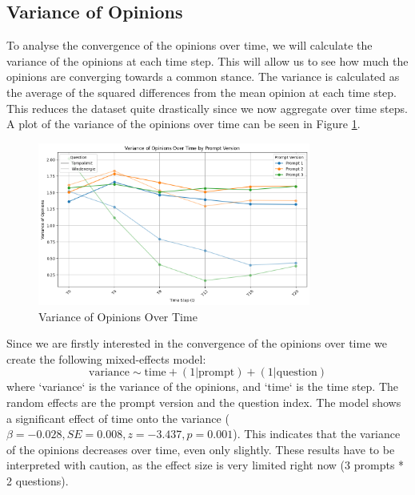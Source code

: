 \documentclass[12pt]{article}
\begin{document}
\subsection{Variance of Opinions}
To analyse the convergence of the opinions over time, we will calculate the variance of the opinions at each time step. This will allow us to see how much the opinions are converging towards a common stance. The variance is calculated as the average of the squared differences from the mean opinion at each time step. This reduces the dataset quite drastically since we now aggregate over time steps. A plot of the variance of the opinions over time can be seen in Figure \ref{fig:variance_of_opinions}. 


\begin{figure}[h]
\centering
\includegraphics[width=0.8\textwidth]{img/variance_of_opinions.png}
\caption{Variance of Opinions Over Time}
\label{fig:variance_of_opinions}
\end{figure}

Since we are firstly interested in the convergence of the opinions over time we create the following mixed-effects model:
\begin{equation}
    \text{variance} \sim \text{time} + (1 | \text{prompt}) + (1 | \text{question})
\end{equation}
where `variance` is the variance of the opinions, and `time` is the time step. The random effects are the prompt version and the question index. The model shows a significant effect of time onto the variance ($\beta = -0.028, SE = 0.008, z = -3.437, p = 0.001$). This indicates that the variance of the opinions decreases over time, even only slightly. These results have to be interpreted with caution, as the effect size is very limited right now (3 prompts * 2 questions).



\end{document}
